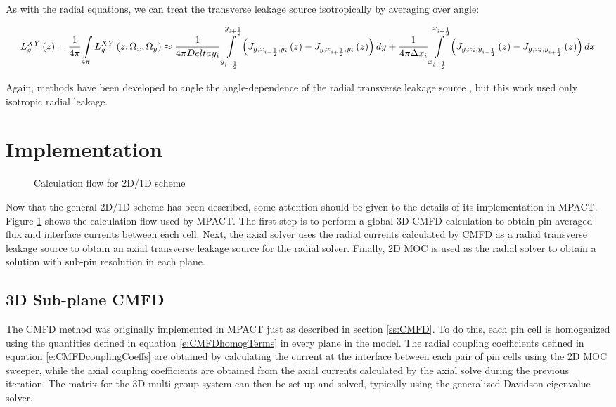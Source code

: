 As with the radial equations, we can treat the transverse leakage source isotropically by averaging over angle:

\begin{dmath}
{L_{g}^{XY}\left(z\right)} = {\frac{1}{4\pi}\intop_{4\pi} L_{g}^{XY}\left(z,\Omega_x,\Omega_y\right)} \approx {\frac{1}{4\pi\\Delta y_i}\intop_{y_{i-\frac{1}{2}}}^{y_{i+\frac{1}{2}}}\left( J_{g,x_{i-\frac{1}{2}},y_i}\left(z\right) - J_{g,x_{i+\frac{1}{2}},y_i}\left(z\right)\right)dy} + {\frac{1}{4\pi\Delta x_i}\intop_{x_{i-\frac{1}{2}}}^{x_{i+\frac{1}{2}}}\left( J_{g,x_i,y_{i-\frac{1}{2}}}\left(z\right) - J_{g,x_i,y_{i+\frac{1}{2}}}\left(z\right)\right)dx}
\end{dmath}

Again, methods have been developed to angle the angle-dependence of the radial transverse leakage source \cite{StimpsonShaneThesis}, but this work used only isotropic radial leakage.

\section{Implementation}

\begin{figure}[h]
  \centering
  
  \caption{Calculation flow for 2D/1D scheme}\label{f:2d1d-flowchart}
\end{figure}

Now that the general 2D/1D scheme has been described, some attention should be given to the details of its implementation in MPACT.  Figure \ref{f:2d1d-flowchart} shows the calculation flow used by MPACT.  The first step is to perform a global 3D CMFD calculation to obtain pin-averaged flux and interface currents between each cell.  Next, the axial solver uses the radial currents calculated by CMFD as a radial transverse leakage source to obtain an axial transverse leakage source for the radial solver.  Finally, 2D MOC is used as the radial solver to obtain a solution with sub-pin resolution in each plane.

\subsection{3D Sub-plane CMFD}\label{ss:2d1d-3dcmfd}

The CMFD method was originally implemented in MPACT just as described in section \ref{ss:CMFD}.  To do this, each pin cell is homogenized using the quantities defined in equation \ref{e:CMFDhomogTerms} in every plane in the model.  The radial coupling coefficients defined in equation \ref{e:CMFDcouplingCoeffs} are obtained by calculating the current at the interface between each pair of pin cells using the 2D MOC sweeper, while the axial coupling coefficients are obtained from the axial currents calculated by the axial solve during the previous iteration.  The matrix for the 3D multi-group system can then be set up and solved, typically using the generalized Davidson eigenvalue solver.

